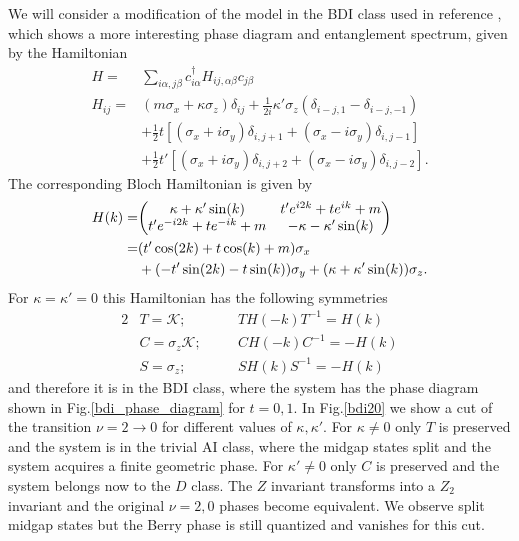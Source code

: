 \documentclass[prb,twocolumn,amsmath,amssymb,superscriptaddress]{revtex4-1}
\begin{document}
We will consider a modification of the model in the BDI class used in reference \cite{Song2014}, which shows a more interesting phase diagram and entanglement spectrum, given by the Hamiltonian
\begin{align}
H =& \sum_{i\alpha,j\beta} c_{i\alpha}^\dagger H_{ij,\alpha \beta} c_{j\beta} \\
H_{ij} =& (m \sigma_x + \kappa \sigma_z)\delta_{ij}  + \frac{1}{2i}\kappa'\sigma_z (\delta_{i-j,1}-\delta_{i-j,-1})\\
&+ \frac{1}{2} t \left[(\sigma_x + i \sigma_y)\delta_{i,j+1} + (\sigma_x - i \sigma_y) \delta_{i,j-1} \right] \\
&+  \frac{1}{2} t' \left[(\sigma_x + i \sigma_y)\delta_{i,j+2} + (\sigma_x - i \sigma_y) \delta_{i,j-2} \right].
\label{bdi_model}
\end{align}
The corresponding Bloch Hamiltonian is given by
\begin{align*}
H(k)=&\mqty( \kappa + \kappa' \sin(k) & t' e^{i2k} + t e^{ik}+m \\t' e^{-i2k} + t e^{-ik}+m & -\kappa-\kappa' \sin(k)  ) \\
=& (t' \cos(2k)+t\cos(k)+m)\sigma_x \\
&+ (-t' \sin(2k)-t\sin(k))\sigma_y + (\kappa+\kappa'\sin(k)) \sigma_z.
\end{align*}
For $\kappa = \kappa' = 0$ this Hamiltonian has the following symmetries
\begin{alignat*}{2}
&T = \mathcal{K} ; \quad &&T H(-k) T^{-1} = H(k) \\
&C = \sigma_z\mathcal{K} ; \quad &&C H(-k) C^{-1} = -H(k) \\
&S = \sigma_z ; \quad &&S H(k)S^{-1} = -H(k) 
\end{alignat*}
and therefore it is in the BDI class, where the system has the phase diagram shown in Fig.\ref{bdi_phase_diagram} for $t=0,1$. In Fig.\ref{bdi20} we show a cut of the transition $\nu = 2 \rightarrow 0$ for different values of $\kappa,\kappa'$. For $\kappa \neq 0$ only $T$ is preserved and the system is in the trivial AI class, where the midgap states split and the system acquires a finite geometric phase. For $\kappa' \neq 0$ only $C$ is preserved and the system belongs now to the $D$ class. The $Z$ invariant transforms into a $Z_2$ invariant and the original $\nu = 2,0$ phases become equivalent. We observe split midgap states but the Berry phase is still quantized and vanishes for this cut.
\end{document}
